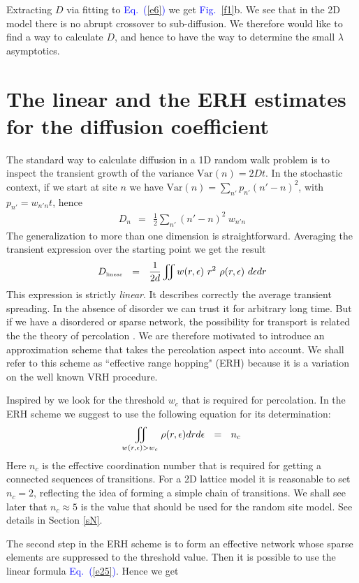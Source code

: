 \documentclass[onecolumn,fleqn,12pt,openany,draft]{book}
\newcommand{\tbox}[1]{\mbox{\tiny #1}}
\newcommand{\mylabel}[1]{\label{#1}}
\newcommand{\beq}{\begin{eqnarray}}
\newcommand{\eeq}{\end{eqnarray}}
\newcommand{\be}[1]{\begin{eqnarray}\ifthenelse{#1=-1}
{\nonumber}{\ifthenelse{#1=0}{}{\mylabel{e#1}}}}
\newcommand{\Eq}[1]{\textcolor{blue}{Eq.\!\!~(\ref{#1})}}
\newcommand{\Fig}[1]{\textcolor{blue}{Fig.}\!\!~\ref{#1}}
\begin{document}
Extracting $D$ via fitting to \Eq{e6} we get \Fig{f1}b. 
We see that in the 2D model there is no abrupt crossover 
to sub-diffusion. We therefore would like to find a way 
to calculate $D$, and hence to have the way to determine 
the small $\lambda$ asymptotics. 


\section{The linear and the ERH estimates for the diffusion coefficient}

The standard way to calculate diffusion
in a 1D random walk problem is to inspect 
the transient growth of the variance $\mbox{Var}(n)=2Dt$.
In the stochastic context, if we start at site $n$
we have ${\mbox{Var}(n)=\sum_{n'} p_{n'} (n'-n)^2}$, 
with $p_{n'}=w_{n'n}t$, hence
%
\beq
D_n \ \ = \ \ \frac{1}{2} \sum_{n'} (n'-n)^2 \ w_{n'n}
\eeq
%
The generalization to more than one dimension
is straightforward. Averaging the transient expression 
over the starting point we get the result  
%
\be{25}
D_{\tbox{linear}}  \ \ = \ \ \frac{1}{2d}\iint w(r,\epsilon) \ r^2  \ \rho(r,\epsilon) \ d\epsilon dr 
\eeq
%
This expression is strictly {\em linear}.
It describes correctly the average transient spreading. 
In the absence of disorder we can trust it for 
arbitrary long time. But if we have a disordered   
or sparse network, the possibility for transport  
is related the the theory of percolation \cite{AHL,Halp,pollak}.
We are therefore motivated to introduce an approximation 
scheme that takes the percolation aspect into account.
We shall refer to this scheme as ``effective range hopping" (ERH) 
because it is a variation on the well known VRH procedure.


Inspired by \cite{AHL,Halp,pollak} we look for the threshold $w_c$ 
that is required for percolation. In the ERH scheme 
we suggest to use the following equation for its determination: 
%
\be{30}
\iint_{w(r,\epsilon)>w_c} \rho(r,\epsilon)drd\epsilon \ \ = \ \ n_c
\eeq
%
Here $n_c$ is the effective coordination number that is 
required for getting a connected sequences of transitions.
For a 2D lattice model it is reasonable to set $n_c=2$, 
reflecting the idea of forming a simple chain of transitions. 
We shall see later that $n_c\approx5$ is the value that should 
be used for the random site model. See details in Section \ref{sN}.

The second step in the ERH scheme is to form an effective 
network whose sparse elements are suppressed to the threshold value.  
Then it is possible to use the linear formula \Eq{e25}. Hence we get 
\end{document}
